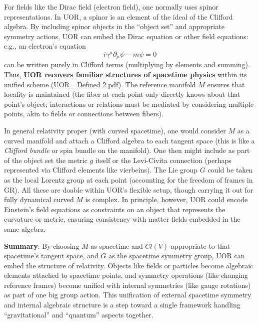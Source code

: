 \documentclass[12pt]{article}
\begin{document}
For fields like the Dirac field (electron field), one normally uses spinor representations. In UOR, a spinor is an element of the ideal of the Clifford algebra. By including spinor objects in the “object set” and appropriate symmetry actions, UOR can embed the Dirac equation or other field equations: e.g., an electron’s equation 
\[
i\gamma^\mu \partial_\mu \psi - m\psi = 0
\]
can be written purely in Clifford terms (multiplying by elements and summing). Thus, \textbf{UOR recovers familiar structures of spacetime physics} within its unified scheme (\href{file://file-TBF3nHDaRR5QeVMmwCFYkp#:~:text=algebra%20contains%20the%20Dirac%20gamma,can%20thus%20embed%20relativistic%20fields}{UOR\_ Defined 2.pdf}). The reference manifold $M$ ensures that locality is maintained (the fiber at each point only directly knows about that point’s object; interactions or relations must be mediated by considering multiple points, akin to fields or connections between fibers).

\medskip

In general relativity proper (with curved spacetime), one would consider $M$ as a curved manifold and attach a Clifford algebra to each tangent space (this is like a \emph{Clifford bundle} or spin bundle on the manifold). One then might include as part of the object set the metric $g$ itself or the Levi-Civita connection (perhaps represented via Clifford elements like vierbeins). The Lie group $G$ could be taken as the local Lorentz group at each point (accounting for the freedom of frames in GR). All these are doable within UOR’s flexible setup, though carrying it out for fully dynamical curved $M$ is complex. In principle, however, UOR could encode Einstein’s field equations as constraints on an object that represents the curvature or metric, ensuring consistency with matter fields embedded in the same algebra.

\medskip

\textbf{Summary}: By choosing $M$ as spacetime and $Cl(V)$ appropriate to that spacetime’s tangent space, and $G$ as the spacetime symmetry group, UOR can embed the structure of relativity. Objects like fields or particles become algebraic elements attached to spacetime points, and symmetry operations (like changing reference frames) become unified with internal symmetries (like gauge rotations) as part of one big group action. This unification of external spacetime symmetry and internal algebraic structure is a step toward a single framework handling ``gravitational'' and ``quantum'' aspects together.
\end{document}
